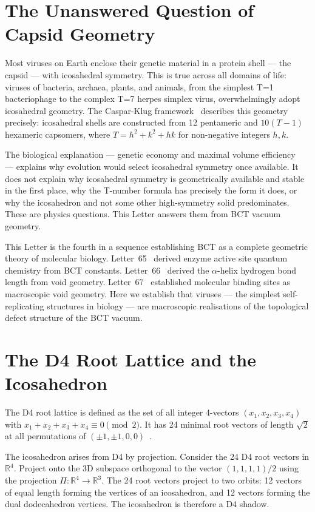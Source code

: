\documentclass[aps,prl,preprint,superscriptaddress,floatfix]{revtex4-2}
\begin{document}
\section{The Unanswered Question of Capsid Geometry}

Most viruses on Earth enclose their genetic material in a protein
shell --- the capsid --- with icosahedral symmetry. This is true
across all domains of life: viruses of bacteria, archaea, plants,
and animals, from the simplest T=1 bacteriophage to the complex
T=7 herpes simplex virus, overwhelmingly adopt icosahedral geometry.
The Caspar-Klug framework~\cite{caspar1962} describes this geometry
precisely: icosahedral shells are constructed from 12 pentameric
and $10(T-1)$ hexameric capsomers, where $T = h^2 + k^2 + hk$ for
non-negative integers $h, k$.

The biological explanation --- genetic economy and maximal volume
efficiency~\cite{crick1956} --- explains why evolution would select
icosahedral symmetry once available. It does not explain why
icosahedral symmetry is geometrically available and stable in the
first place, why the T-number formula has precisely the form it does,
or why the icosahedron and not some other high-symmetry solid
predominates. These are physics questions. This Letter answers them
from BCT vacuum geometry.

This Letter is the fourth in a sequence establishing BCT as a
complete geometric theory of molecular biology.
Letter~65~\cite{bct65} derived enzyme active site quantum chemistry
from BCT constants. Letter~66~\cite{bct66} derived the $\alpha$-helix
hydrogen bond length from void geometry. Letter~67~\cite{bct67}
established molecular binding sites as macroscopic void geometry.
Here we establish that viruses --- the simplest self-replicating
structures in biology --- are macroscopic realisations of the
topological defect structure of the BCT vacuum.

\section{The D4 Root Lattice and the Icosahedron}

The D4 root lattice is defined as the set of all integer 4-vectors
$(x_1, x_2, x_3, x_4)$ with $x_1 + x_2 + x_3 + x_4 \equiv 0\pmod{2}$.
It has 24 minimal root vectors of length $\sqrt{2}$ at all permutations
of $(\pm 1, \pm 1, 0, 0)$~\cite{prl,monograph}.

The icosahedron arises from D4 by projection. Consider the 24 D4
root vectors in $\mathbb{R}^4$. Project onto the 3D subspace
orthogonal to the vector $(1,1,1,1)/2$ using the projection
$\Pi: \mathbb{R}^4 \to \mathbb{R}^3$. The 24 root vectors project
to two orbits: 12 vectors of equal length forming the vertices of
an icosahedron, and 12 vectors forming the dual dodecahedron
vertices. The icosahedron is therefore a D4 shadow.
\end{document}
